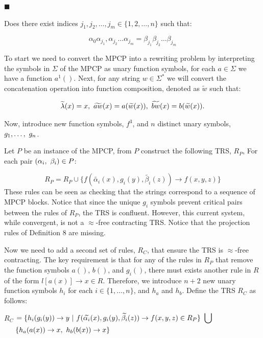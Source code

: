 \documentclass[10pt,a4paper]{amsart}
\begin{document}
 
\par\noindent  $\blacksquare$ 
 
Does there exist indices $j_{1},j_{2},\ldots,j_{m}\in\{1,2,\ldots,n\}$ such that:\par
    \[\alpha_{0}\alpha_{j_{1}},\alpha_{j_{2}}\ldots\alpha_{j_{m}}=\beta_{j_{1}}\beta%
_{j_{2}}\ldots\beta_{j_{m}}\]    
 
  
 
 
To start we need to convert the MPCP into a rewriting problem by interpreting the symbols in $\Sigma$ of the MPCP as unary function symbols, for each $a\in\Sigma$ we have a function $a^{1}()$. Next, for any string $w\in\Sigma^{*}$ we will convert the concatenation operation into function composition, denoted as $\widetilde{w}$ such that:\par
    \[\widetilde{\lambda}(x)=x,\leavevmode\nobreak\ \widetilde{aw}(x)=a(\widetilde{w%
}(x)),\leavevmode\nobreak\ \widetilde{bw}(x)=b(\widetilde{w}(x)).\]    
 
 
Now, introduce new function symbols, $f^{3}$, and $n$ distinct unary symbols, $g_{1},\ldots,\leavevmode\nobreak\ g_{n}$.\par
 
 
 
Let $P$ be an instance of the MPCP, from $P$ construct the following TRS, $R_{P}$, For each pair $(\alpha_{i},\leavevmode\nobreak\ \beta_{i})\in P$:\par
    \[R_{P}=R_{P}\cup\{f(\widetilde{\alpha_{i}}(x),g_{i}(y),\widetilde{\beta_{i}}(z)%
)\rightarrow f(x,y,z)\}\]    
These rules can be seen as checking that the strings correspond to a sequence of MPCP blocks. Notice that since the unique $g_{i}$ symbols prevent critical pairs between the rules of $R_{P}$, the TRS is confluent. However, this current system, while convergent, is not a $\approx$-free contracting TRS. Notice that the projection rules of Definition 8 are missing.\par
 
 
 
Now we need to add a second set of rules, $R_{C}$, that ensure the TRS is $\approx$-free contracting. The key requirement is that for any of the rules in $R_{P}$ that remove the function symbols $a()$, $b()$, and $g_{i}()$, there must exists another rule in $R$ of the form $l[a(x)]\rightarrow x\in R$. Therefore, we introduce $n+2$ new unary function symbols $h_{i}$ for each $i\in\{1,\ldots,n\}$, and $h_{a}$ and $h_{b}$. Define the TRS $R_{C}$ as follows:\par
    $\displaystyle R_{C}$ $\displaystyle=\{h_{i}(g_{i}(y))\rightarrow y\leavevmode\nobreak\ |\leavevmode%
\nobreak\ f(\widetilde{\alpha_{i}}(x),g_{i}(y),\widetilde{\beta_{i}}(z))%
\rightarrow f(x,y,z)\in R_{P}\}\leavevmode\nobreak\ \bigcup$      $\displaystyle\hphantom{==}\{h_{a}(a(x))\rightarrow x,\leavevmode\nobreak\ h_{b%
}(b(x))\rightarrow x\}$    
 
\end{document}
